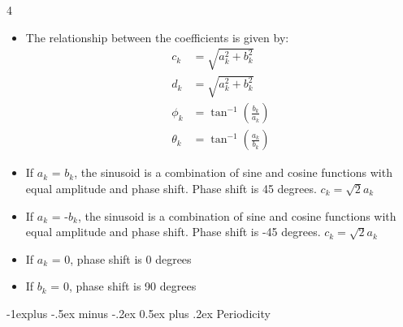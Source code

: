\documentclass[10pt, landscape]{article}
\makeatletter
\renewcommand{\subsection}{\@startsection{subsection}{2}{0mm}%
  {-1explus -.5ex minus -.2ex}%
  {0.5ex plus .2ex}%
{\normalfont\normalsize\bfseries}}
\makeatother
\begin{document}
\begin{multicols*}{4}
\begin{itemize}
\begin{itemize}
      \item The relationship between the coefficients is given by:
      \begin{equation}
        \begin{aligned}
          c_k & = \sqrt{a_k^2 + b_k^2} \\
          d_k & = \sqrt{a_k^2 + b_k^2} \\
          \phi_k & = \tan^{-1}\left(\frac{b_k}{a_k}\right) \\
          \theta_k & = \tan^{-1}\left(\frac{a_k}{b_k}\right)
        \end{aligned}
      \end{equation}
      \item If $a_k$ = $b_k$, the sinusoid is a combination of sine and cosine functions with equal amplitude and phase shift. Phase shift is 45 degrees. $c_k = \sqrt{2}a_k$
      \item If $a_k$ = -$b_k$, the sinusoid is a combination of sine and cosine functions with equal amplitude and phase shift. Phase shift is -45 degrees. $c_k = \sqrt{2}a_k$
      \item If $a_k$ = 0, phase shift is 0 degrees
      \item If $b_k$ = 0, phase shift is 90 degrees
    \end{itemize}
  \end{itemize}

  \subsection{Periodicity}


\end{multicols*}
\end{document}
